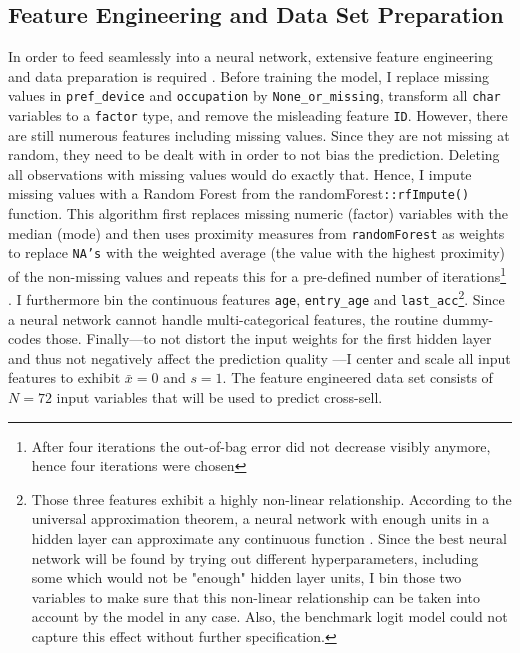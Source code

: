\documentclass[12pt,a4paper]{article}
\newcommand{\pkg}[1]{{\normalfont\fontseries{b}\selectfont #1}}
\let\code=\texttt
\begin{document}
\subsection{Feature Engineering and Data Set Preparation}
In order to feed seamlessly into a neural network, extensive feature engineering and data preparation is required \citep{hastieElementsStatisticalLearning2017}.
Before training the model, I replace missing values in \code{pref\_device} and \code{occupation} by \code{None\_or\_missing}, transform all \code{char} variables to a \code{factor} type, and remove the misleading feature \code{ID}.
However, there are still numerous features including missing values. Since they are not missing at random, they need to be dealt with in order to not
bias the prediction.
Deleting all observations with missing values would do exactly that.
Hence, I impute missing values with a Random Forest from the \pkg{randomForest}\code{::rfImpute()} function.
This algorithm first replaces missing numeric (factor) variables with the median (mode) and then uses proximity measures from \code{randomForest}
as weights to replace \code{NA's} with the weighted average (the value with the highest proximity) of the non-missing values and repeats this for a
pre-defined number of iterations\footnote{After four iterations the out-of-bag error did not decrease visibly anymore, hence four iterations were chosen}
 \citep{liawClassificationRegressionRandomForest2002}.
I furthermore bin the continuous features \code{age}, \code{entry\_age} and \code{last\_acc}\footnote{Those three features exhibit a highly
non-linear relationship. According to the universal approximation theorem, a 
neural network with enough units in a hidden layer can approximate any continuous function \citep{hornikApproximationCapabilitiesMultilayer1991}.
Since the best neural network will be found by trying out different hyperparameters, including some which would not be "enough" hidden layer units, I bin
those two variables to make sure that this non-linear relationship can be taken into account by the model in any case. Also, the benchmark logit model
could not capture this effect without further specification.}.
Since a neural network cannot handle multi-categorical features, the routine dummy-codes those.
Finally---to not distort the input weights for the first hidden layer and thus not negatively affect the prediction quality 
\citep[pp. 398]{hastieElementsStatisticalLearning2017}---I center and scale all input features to exhibit $\bar{x}=0$ and $s=1$.
The feature engineered data set consists of $N=72$ input variables that will be used to predict cross-sell. 
\end{document}
